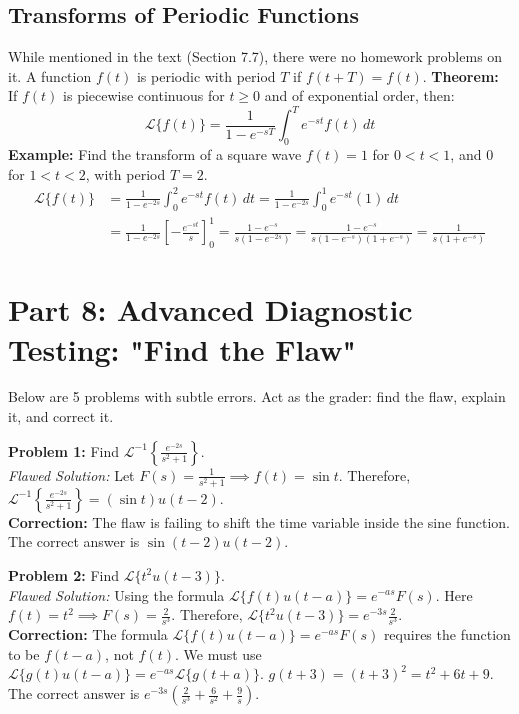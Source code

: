 \documentclass[11pt, letterpaper]{article}
\theoremstyle{definition}
\theoremstyle{remark}
\newcommand{\Lap}{\mathcal{L}}
\begin{document}
\subsection{Transforms of Periodic Functions}
While mentioned in the text (Section 7.7), there were no homework problems on it. A function $f(t)$ is periodic with period $T$ if $f(t+T) = f(t)$. 
\textbf{Theorem:} If $f(t)$ is piecewise continuous for $t \ge 0$ and of exponential order, then:
\[
\Lap\{f(t)\} = \frac{1}{1 - e^{-sT}} \int_0^T e^{-st}f(t)\,dt
\]
\textbf{Example:} Find the transform of a square wave $f(t) = 1$ for $0<t<1$, and $0$ for $1<t<2$, with period $T=2$.
\begin{align*}
\Lap\{f(t)\} &= \frac{1}{1 - e^{-2s}} \int_0^2 e^{-st}f(t)\,dt = \frac{1}{1 - e^{-2s}} \int_0^1 e^{-st}(1)\,dt \\
&= \frac{1}{1 - e^{-2s}} \left[ -\frac{e^{-st}}{s} \right]_0^1 = \frac{1 - e^{-s}}{s(1 - e^{-2s})} = \frac{1 - e^{-s}}{s(1 - e^{-s})(1 + e^{-s})} = \frac{1}{s(1 + e^{-s})}
\end{align*}

\section{Part 8: Advanced Diagnostic Testing: "Find the Flaw"}

Below are 5 problems with subtle errors. Act as the grader: find the flaw, explain it, and correct it.

\textbf{Problem 1:} Find $\Lap^{-1}\left\{ \frac{e^{-2s}}{s^2+1} \right\}$.
\\[4pt]
\textit{Flawed Solution:} 
Let $F(s) = \frac{1}{s^2+1} \implies f(t) = \sin t$.
Therefore, $\Lap^{-1}\left\{ \frac{e^{-2s}}{s^2+1} \right\} = (\sin t) u(t-2)$.
\\[4pt]
\textbf{Correction:} The flaw is failing to shift the time variable inside the sine function. The correct answer is $\sin(t-2)u(t-2)$.

\textbf{Problem 2:} Find $\Lap\{t^2 u(t-3)\}$.
\\[4pt]
\textit{Flawed Solution:}
Using the formula $\Lap\{f(t)u(t-a)\} = e^{-as}F(s)$.
Here $f(t) = t^2 \implies F(s) = \frac{2}{s^3}$.
Therefore, $\Lap\{t^2 u(t-3)\} = e^{-3s} \frac{2}{s^3}$.
\\[4pt]
\textbf{Correction:} The formula $\Lap\{f(t)u(t-a)\} = e^{-as}F(s)$ requires the function to be $f(t-a)$, not $f(t)$. We must use $\Lap\{g(t)u(t-a)\} = e^{-as}\Lap\{g(t+a)\}$. $g(t+3) = (t+3)^2 = t^2+6t+9$. The correct answer is $e^{-3s}(\frac{2}{s^3} + \frac{6}{s^2} + \frac{9}{s})$.
\end{document}
